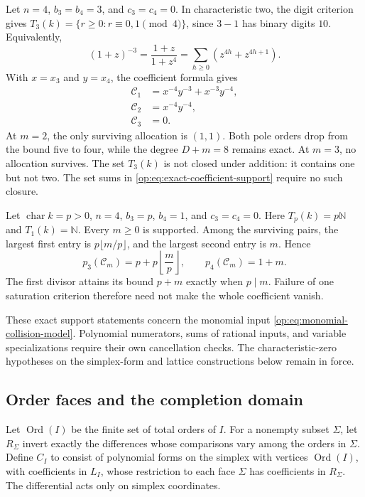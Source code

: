 \begin{example}
\label{op:ex:four-point-characteristic-two}
Let \(n=4\), \(b_3=b_4=3\), and \(c_3=c_4=0\).
In characteristic two, the digit criterion gives
\(T_3(k)=\{r\ge0:r\equiv0,1\pmod4\}\), since \(3-1\)
has binary digits \(10\).  Equivalently,
\[
 (1+z)^{-3}=\frac{1+z}{1+z^4}
           =\sum_{h\ge0}(z^{4h}+z^{4h+1}).
\]
With \(x=x_3\) and \(y=x_4\), the coefficient formula gives
\[
 \begin{aligned}
 \mathcal C_1&=x^{-4}y^{-3}+x^{-3}y^{-4},\\
 \mathcal C_2&=x^{-4}y^{-4},\\
 \mathcal C_3&=0.
 \end{aligned}
\]
At \(m=2\), the only surviving allocation is \((1,1)\).
Both pole orders drop from the bound five to four, while the
degree \(D+m=8\) remains exact.  At \(m=3\), no allocation
survives.  The set \(T_3(k)\) is not closed under addition:
it contains one but not two.  The set sums in
\eqref{op:eq:exact-coefficient-support} require no such closure.
\end{example}

\begin{example}
\label{op:ex:four-point-prime-staircase}
Let \(\operatorname{char}k=p>0\), \(n=4\),
\(b_3=p\), \(b_4=1\), and \(c_3=c_4=0\).
Here \(T_p(k)=p\mathbb N\) and \(T_1(k)=\mathbb N\).
Every \(m\ge0\) is supported.  Among the surviving pairs,
the largest first entry is \(p\lfloor m/p\rfloor\),
and the largest second entry is \(m\).  Hence
\[
 p_3(\mathcal C_m)=p+p\left\lfloor\frac mp\right\rfloor,
 \qquad p_4(\mathcal C_m)=1+m.
\]
The first divisor attains its bound \(p+m\) exactly when
\(p\mid m\).  Failure of one saturation criterion therefore
need not make the whole coefficient vanish.
\end{example}

These exact support statements concern the monomial input
\eqref{op:eq:monomial-collision-model}.  Polynomial numerators, sums
of rational inputs, and variable specializations require their own
cancellation checks.  The characteristic-zero hypotheses on the
simplex-form and lattice constructions below remain in force.

\subsection{Order faces and the completion domain}

Let \(\operatorname{Ord}(I)\) be the finite set of total orders of
\(I\).  For a nonempty subset \(\Sigma\), let \(R_\Sigma\)
invert exactly the differences whose comparisons vary among the
orders in \(\Sigma\).  Define \(C_I\) to consist of polynomial
forms on the simplex with vertices \(\operatorname{Ord}(I)\), with
coefficients in \(L_I\), whose restriction to each face \(\Sigma\)
has coefficients in \(R_\Sigma\).  The differential acts only on
simplex coordinates.

